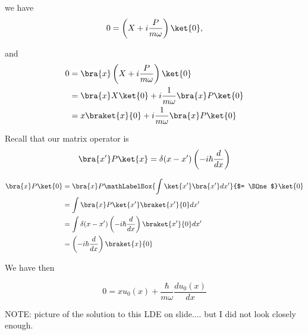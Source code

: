 we have
\begin{equation}\label{eqn:PHY356FLecture11:520}
0
=
\left( X + i \frac{P}{m \omega} \right) \ket{0},
\end{equation}

and
\begin{align*}
0
&=
\bra{x} \left( X + i \frac{P}{m \omega} \right) \ket{0} \\
&=
\bra{x} X \ket{0 } + i \frac{1}{m \omega} \bra{x} P \ket{0} \\
&=
x \braket{x}{0} + i \frac{1}{m \omega} \bra{x} P \ket{0} \\
\end{align*}

Recall that our matrix operator is
\begin{equation}\label{eqn:PHY356FLecture11:540}
\bra{x'} P \ket{x} = \delta(x - x') \left( -i \hbar \frac{d}{dx} \right)
\end{equation}

\begin{align*}
\bra{x} P \ket{0}
&=
\bra{x} P 
\mathLabelBox{\int \ket{x'} \bra{x'} dx' }{$= \BOne$}
\ket{0} \\
&=
\int \bra{x} P \ket{x'} \braket{x'}{0} dx' \\
&=
\int
\delta(x - x') \left( -i \hbar \frac{d}{dx} \right)
\braket{x'}{0} dx' \\
&=
\left( -i \hbar \frac{d}{dx} \right)
\braket{x}{0}
\end{align*}

We have then

\begin{equation}\label{eqn:PHY356FLecture11:600}
0 =
x u_0(x) + \frac{\hbar}{m \omega} \frac{d u_0(x)}{dx}
\end{equation}

NOTE: picture of the solution to this LDE on slide.... but I did not look closely enough.

